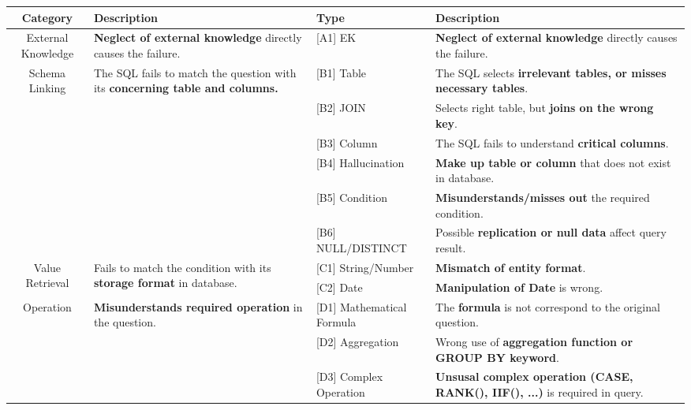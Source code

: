 \begin{table*}[t]
\centering
\begin{adjustbox}{max width=\textwidth}
\begin{tabular}{c p{5.5cm} l p{6cm} }
\toprule
\textbf{Category} & \textbf{Description} & \textbf{Type} & \textbf{Description}\\
\midrule
\multirow{1}{*}{External Knowledge} 
    & \textbf{Neglect of external knowledge} directly causes the failure.
    & [A1] EK 
    & \textbf{Neglect of external knowledge} directly causes the failure.
    \\
\midrule
\multirow{6}{*}{Schema Linking} 
    & \multirow{6}{=}{The SQL fails to match the question with its \textbf{concerning table and columns.}}
    & [B1] Table 
    & The SQL selects \textbf{irrelevant tables, or misses necessary tables}. 
    \\
    & & [B2] JOIN & Selects right table, but \textbf{joins on the wrong key}.
    \\
    & & [B3] Column & The SQL fails to understand \textbf{critical columns}. 
    \\
    & & [B4] Hallucination & \textbf{Make up table or column} that does not exist in database.
    \\
    & & [B5] Condition & \textbf{Misunderstands/misses out} the required condition.
    \\
    & & [B6] NULL/DISTINCT & Possible \textbf{replication or null data} affect query result.
    \\
\midrule
\multirow{2}{*}{Value Retrieval}
    & \multirow{2}{=}{Fails to match the condition with its \textbf{storage format} in  database.}
    & [C1] String/Number 
    & \textbf{Mismatch of entity format}.
    \\
    & & [C2] Date & \textbf{Manipulation of Date} is wrong.
    \\
\midrule
\multirow{3}{*}{Operation}
    & \multirow{3}{=}{\textbf{Misunderstands required operation} in the question.}
    & [D1] Mathematical Formula 
    & The \textbf{formula} is not correspond to the original question.
    \\
    & & [D2] Aggregation & Wrong use of \textbf{aggregation function or GROUP BY keyword}.
    \\
    & & [D3] Complex Operation & \textbf{Unsusal complex operation (CASE, RANK(), IIF(), ...)} is required in query.

\end{tabular}
\end{adjustbox}
\end{table*}
